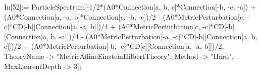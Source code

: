 In[52]:= ParticleSpectrum[-1/2*(A0*Connection[a, b, c]*Connection[-b, -c, -a]) + (A0*Connection[a, -a, b]*Connection[c, -b, -c])/2 - (A0*MetricPerturbation[c, -c]*CD[-b][Connection[a, -a, b]])/4 + (A0*MetricPerturbation[c, -c]*CD[-b][Connection[a, b, -a]])/4 - (A0*MetricPerturbation[-a, -c]*CD[-b][Connection[a, b, c]])/2 + (A0*MetricPerturbation[-b, -c]*CD[c][Connection[a, -a, b]])/2, TheoryName -> "MetricAffineEinsteinHilbertTheory", Method -> "Hard", MaxLaurentDepth -> 3]; 